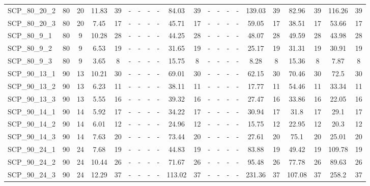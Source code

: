 \begin{sidewaystable}[!ht]
{\begin{tabular}{lcccccccccccccccccccc}
SCP\_80\_20\_2 & 80 & 20 &  \textcolor{blue2}{11.83} & 39 &  - &  - &  - &  - & 84.03 & 39 &  - &  - &  - &  - & 139.03 & 39 & 82.96 & 39 & 116.26 & 39 \\
SCP\_80\_20\_3 & 80 & 20 &  \textcolor{blue2}{7.45} & 17 &  - &  - &  - &  - & 45.71 & 17 &  - &  - &  - &  - & 59.05 & 17 & 38.51 & 17 & 53.66 & 17 \\
SCP\_80\_9\_1 & 80 & 9 &  \textcolor{blue2}{10.28} & 28 &  - &  - &  - &  - & 44.25 & 28 &  - &  - &  - &  - & 48.07 & 28 & 49.59 & 28 & 43.98 & 28 \\
SCP\_80\_9\_2 & 80 & 9 &  \textcolor{blue2}{6.53} & 19 &  - &  - &  - &  - & 31.65 & 19 &  - &  - &  - &  - & 25.17 & 19 & 31.31 & 19 & 30.91 & 19 \\
SCP\_80\_9\_3 & 80 & 9 &  \textcolor{blue2}{3.65} & 8 &  - &  - &  - &  - & 15.75 & 8 &  - &  - &  - &  - & 8.28 & 8 & 15.36 & 8 & 7.87 & 8 \\
SCP\_90\_13\_1 & 90 & 13 &  \textcolor{blue2}{10.21} & 30 &  - &  - &  - &  - & 69.01 & 30 &  - &  - &  - &  - & 62.15 & 30 & 70.46 & 30 & 72.5 & 30 \\
SCP\_90\_13\_2 & 90 & 13 &  \textcolor{blue2}{6.23} & 11 &  - &  - &  - &  - & 38.11 & 11 &  - &  - &  - &  - & 17.77 & 11 & 54.46 & 11 & 33.34 & 11 \\
SCP\_90\_13\_3 & 90 & 13 &  \textcolor{blue2}{5.55} & 16 &  - &  - &  - &  - & 39.32 & 16 &  - &  - &  - &  - & 27.47 & 16 & 33.86 & 16 & 22.05 & 16 \\
SCP\_90\_14\_1 & 90 & 14 &  \textcolor{blue2}{5.92} & 17 &  - &  - &  - &  - & 34.22 & 17 &  - &  - &  - &  - & 30.94 & 17 & 31.8 & 17 & 29.1 & 17 \\
SCP\_90\_14\_2 & 90 & 14 &  \textcolor{blue2}{6.01} & 12 &  - &  - &  - &  - & 24.96 & 12 &  - &  - &  - &  - & 15.75 & 12 & 22.95 & 12 & 20.3 & 12 \\
SCP\_90\_14\_3 & 90 & 14 &  \textcolor{blue2}{7.63} & 20 &  - &  - &  - &  - & 73.44 & 20 &  - &  - &  - &  - & 27.61 & 20 & 75.1 & 20 & 25.01 & 20 \\
SCP\_90\_24\_1 & 90 & 24 &  \textcolor{blue2}{7.68} & 19 &  - &  - &  - &  - & 44.83 & 19 &  - &  - &  - &  - & 83.88 & 19 & 49.42 & 19 & 109.78 & 19 \\
SCP\_90\_24\_2 & 90 & 24 &  \textcolor{blue2}{10.44} & 26 &  - &  - &  - &  - & 71.67 & 26 &  - &  - &  - &  - & 95.48 & 26 & 77.78 & 26 & 89.63 & 26 \\
SCP\_90\_24\_3 & 90 & 24 &  \textcolor{blue2}{12.29} & 37 &  - &  - &  - &  - & 113.02 & 37 &  - &  - &  - &  - & 231.36 & 37 & 107.08 & 37 & 258.2 & 37 \\

\end{tabular}}
\end{sidewaystable}
